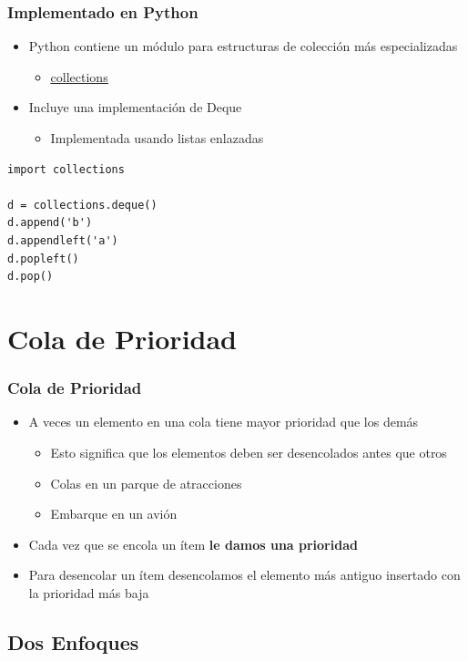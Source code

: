 \documentclass[11pt]{beamer}
\begin{document}
\begin{frame}[fragile]\frametitle{Implementado en Python}
\begin{itemize}
\item Python contiene un módulo para estructuras de colección más especializadas
    \begin{itemize}
    \item \href{https://docs.python.org/3/library/collections.html}{\color{blue}\underline{collections}}
    \end{itemize}
\item Incluye una implementación de Deque
    \begin{itemize}
    \item Implementada usando listas enlazadas
    \end{itemize}
\end{itemize}
\begin{lstlisting}
import collections

d = collections.deque()
d.append('b')
d.appendleft('a')
d.popleft()
d.pop()
\end{lstlisting}
\end{frame}


\section{Cola de Prioridad}

\begin{frame}\frametitle{Cola de Prioridad}
\begin{itemize}
\item A veces un elemento en una cola tiene mayor prioridad que los demás
    \begin{itemize}
    \item Esto significa que los elementos deben ser desencolados antes que otros
    \item Colas en un parque de atracciones
    \item Embarque en un avión
    \end{itemize}
\item Cada vez que se encola un ítem \textbf{le damos una prioridad}
\item Para desencolar un ítem desencolamos el elemento más antiguo insertado con la prioridad más baja
\end{itemize}
\end{frame}

\subsection{Dos Enfoques}
\end{document}
